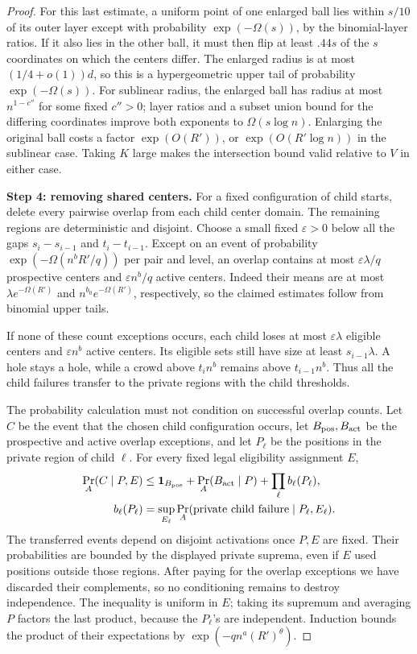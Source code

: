 \begin{proof}
For this last estimate, a uniform point of one enlarged ball lies within
\(s/10\) of its outer layer except with probability
\(\exp(-\Omega(s))\), by the binomial-layer ratios. If it also lies in
the other ball, it must then flip at least \(.44s\) of the \(s\)
coordinates on which the centers differ. The enlarged radius is at most
\((1/4+o(1))d\), so this is a hypergeometric upper tail of probability
\(\exp(-\Omega(s))\). For sublinear radius, the enlarged ball has
radius at most \(n^{1-c''}\) for some fixed \(c''>0\); layer ratios and
a subset union bound for the differing coordinates improve both
exponents to \(\Omega(s\log n)\). Enlarging the original ball costs a
factor \(\exp(O(R'))\), or \(\exp(O(R'\log n))\) in the sublinear case.
Taking \(K\) large makes the intersection bound valid relative to \(V\)
in either case.

\noindent\textbf{Step 4: removing shared centers.}\quad
For a fixed configuration of child starts, delete every pairwise overlap
from each child center domain. The remaining regions are deterministic
and disjoint. Choose a small fixed \(\varepsilon>0\) below all the gaps
\(s_i-s_{i-1}\) and \(t_i-t_{i-1}\). Except on an event of probability
\(\exp(-\Omega(n^bR'/q))\) per pair and level, an overlap contains at most
\(\varepsilon\lambda/q\) prospective centers and
\(\varepsilon n^b/q\) active centers. Indeed their means are at most
\(\lambda e^{-\Omega(R')}\) and \(n^{b_0}e^{-\Omega(R')}\), respectively,
so the claimed estimates follow from binomial upper tails.

If none of these count exceptions occurs, each child loses at most
\(\varepsilon\lambda\) eligible centers and \(\varepsilon n^b\) active
centers. Its eligible sets still have size at least
\(s_{i-1}\lambda\). A hole stays a hole, while a crowd above \(t_i n^b\)
remains above \(t_{i-1}n^b\). Thus all the child failures transfer to the
private regions with the child thresholds.

The probability calculation must not condition on successful overlap
counts. Let \(C\) be the event that the chosen child configuration occurs,
let \(B_{\rm pos},B_{\rm act}\) be the prospective and active overlap
exceptions, and let \(P_\ell\) be the positions in the private region of
child \(\ell\). For every fixed legal eligibility assignment \(E\),
\[
 \begin{aligned}
 \Pr_A(C\mid P,E)
 &\le\mathbf1_{B_{\rm pos}}+\Pr_A(B_{\rm act}\mid P)
          +\prod_\ell b_\ell(P_\ell),\\
 b_\ell(P_\ell)
 &=\sup_{E_\ell}\Pr_A(\text{private child failure}\mid P_\ell,E_\ell).
 \end{aligned}
\]
The transferred events depend on disjoint activations once \(P,E\) are
fixed. Their probabilities are bounded by the displayed private
suprema, even if \(E\) used positions outside those regions. After
paying for the overlap exceptions we have discarded their complements,
so no conditioning remains to destroy independence. The inequality is
uniform in \(E\); taking its supremum and averaging \(P\) factors the
last product, because the \(P_\ell\)'s are independent. Induction bounds
the product of their expectations by \(\exp(-q n^a(R')^\theta)\).


\end{proof}
